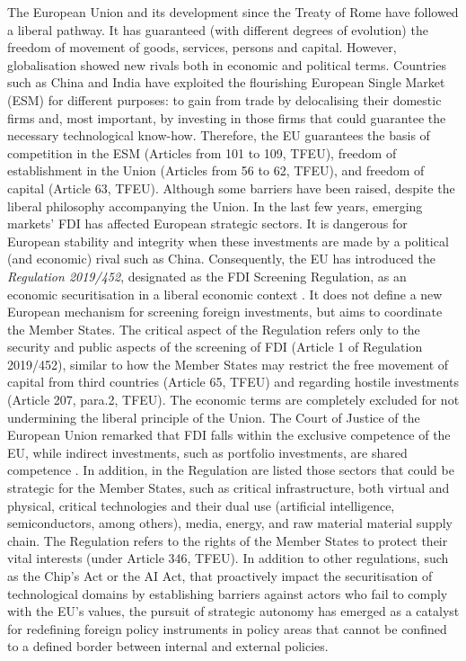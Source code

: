 The European Union and its development since the Treaty of Rome have followed a liberal pathway. It has guaranteed (with different degrees of evolution) the freedom of movement of goods, services, persons and capital. However, globalisation showed new rivals both in economic and political terms. Countries such as China and India have exploited the flourishing European Single Market (ESM) for different purposes: to gain from trade by delocalising their domestic firms and, most important, by investing in those firms that could guarantee the necessary technological know-how. Therefore, the EU guarantees the basis of competition in the ESM (Articles from 101 to 109, TFEU), freedom of establishment in the Union (Articles from 56 to 62, TFEU), and freedom of capital (Article 63, TFEU). Although some barriers have been raised, despite the liberal philosophy accompanying the Union. In the last few years, emerging markets' FDI has affected European strategic sectors. It is dangerous for European stability and integrity when these investments are made by a political (and economic) rival such as China. Consequently, the EU has introduced the \textit{Regulation 2019/452}, designated as the FDI Screening Regulation, as an economic securitisation in a liberal economic context \autocite{shilder_2022_securitisation}. It does not define a new European mechanism for screening foreign investments, but aims to coordinate the Member States. The critical aspect of the Regulation refers only to the security and public aspects of the screening of FDI (Article 1 of Regulation 2019/452), similar to how the Member States may restrict the free movement of capital from third countries (Article 65, TFEU) and regarding hostile investments (Article 207, para.2, TFEU). The economic terms are completely excluded for not undermining the liberal principle of the Union. The Court of Justice of the European Union remarked that FDI falls within the exclusive competence of the EU, while indirect investments, such as portfolio investments, are shared competence \autocite{cjeu_2015_opinion}. In addition, in the Regulation are listed those sectors that could be strategic for the Member States, such as critical infrastructure, both virtual and physical, critical technologies and their dual use (artificial intelligence, semiconductors, among others), media, energy, and raw material material supply chain. The Regulation refers to the rights of the Member States to protect their vital interests (under Article 346, TFEU). In addition to other regulations, such as the Chip's Act or the AI Act, that proactively impact the securitisation of technological domains by establishing barriers against actors who fail to comply with the EU's values, the pursuit of strategic autonomy has emerged as a catalyst for redefining foreign policy instruments in policy areas that cannot be confined to a defined border between internal and external policies.

